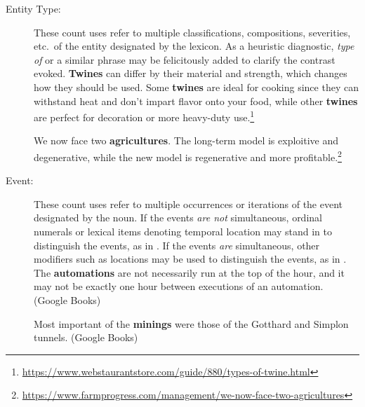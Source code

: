 \documentclass[output=paper]{langscibook}
\begin{document}
\begin{description}
\item[Entity Type:] These count uses refer to multiple classifications, compositions, severities, etc.\ of the entity designated by the lexicon. As a heuristic diagnostic, \emph{type of} or a similar phrase may be felicitously added to clarify the contrast evoked.
\eanoraggedright \label{gri-ric:ex:twines}
\textbf{Twines} can differ by their material and strength, which changes how they should be used. Some \textbf{twines} are ideal for cooking since they can withstand heat and don’t impart flavor onto your food, while other \textbf{twines} are perfect for decoration or more heavy-duty use.\footnote{\url{https://www.webstaurantstore.com/guide/880/types-of-twine.html}} \z

\eanoraggedright \label{gri-ric:ex:agricultures} We now face two \textbf{agricultures}. The long-term model is exploitive and degenerative, while the new model is regenerative and more profitable.\footnote{\url{https://www.farmprogress.com/management/we-now-face-two-agricultures}} \z



\item[Event:] These count uses refer to multiple occurrences or iterations of the event designated by the noun. If the events \textit{are not} simultaneous, ordinal numerals or lexical items denoting temporal location may stand in to distinguish the events, as in  . %
If the events \textit{are} simultaneous, other modifiers such as locations may be used to distinguish the events, as in .
\eanoraggedright \label{gri-ric:ex:automations}
The \textbf{automations} are not necessarily run at the top of the hour, and it may not be exactly one hour between executions of an automation.\\\null\hfill (Google Books) 
\z 

\eanoraggedright \label{gri-ric:ex:minings}
Most important of the \textbf{minings} were those of the Gotthard and Simplon tunnels. \hfill (Google Books)
\z



\end{description}
\end{document}
